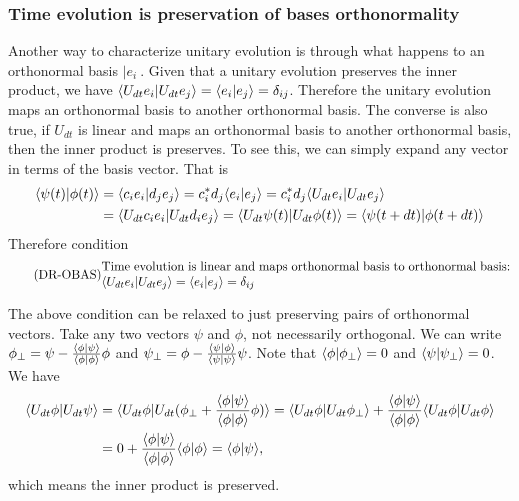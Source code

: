 \subsubsection{Time evolution is preservation of bases orthonormality}
Another way to characterize unitary evolution is through what happens to an orthonormal basis $|e_i\>$. Given that a unitary evolution preserves the inner product, we have $\langle U_{d t} e_i | U_{d t} e_j \rangle = \langle e_i | e_j \rangle = \delta_{ij}$. Therefore the unitary evolution maps an orthonormal basis to another orthonormal basis. The converse is also true, if $U_{dt}$ is linear and maps an orthonormal basis to another orthonormal basis, then the inner product is preserves. To see this, we can simply expand any vector in terms of the basis vector. That is
\begin{equation}
	\begin{aligned}
		\langle\psi(t) | \phi(t)\rangle &= \langle c_i e_i | d_j e_j\rangle = c_i^* d_j \langle e_i | e_j\rangle = c_i^* d_j \langle U_{d t} e_i | U_{d t} e_j\rangle \\
		&= \langle U_{d t} c_i e_i | U_{d t} d_i e_j\rangle = \langle U_{d t} \psi(t) | U_{d t} \phi(t)\rangle = \langle \psi(t + d t) | \phi(t + d t)\rangle \\
	\end{aligned}
\end{equation}
Therefore condition
\begin{equation}\label{rp-qm-uev-condOrthonormalBasis}
	\tag{DR-OBAS}
	\eqtext{Time evolution is linear and maps orthonormal basis to orthonormal basis: $\< U_{d t} e_i | U_{d t} e_j \> = \< e_i | e_j \> = \delta_{ij}$} 
\end{equation}

The above condition can be relaxed to just preserving pairs of orthonormal vectors. Take any two vectors $\psi$ and $\phi$, not necessarily orthogonal. We can write $\phi_{\perp} = \psi - \frac{\langle\phi | \psi\rangle}{\langle\phi | \phi\rangle }\phi $ and $\psi_{\perp} = \phi - \frac{\langle\psi | \phi\rangle}{\langle\psi | \psi\rangle }\psi $. Note that $\langle\phi | \phi_{\perp}\rangle = 0$ and $\langle\psi | \psi_{\perp}\rangle = 0$. We have
\begin{equation}
	\begin{aligned}
		\langle U_{dt} \phi | U_{dt} \psi \rangle &= \langle U_{dt} \phi | U_{dt} (\phi_{\perp} + \frac{\langle\phi | \psi\rangle}{\langle\phi | \phi\rangle }\phi) \rangle = \langle U_{dt} \phi | U_{dt} \phi_{\perp}\rangle + \frac{\langle\phi | \psi\rangle}{\langle\phi | \phi\rangle } \langle U_{dt} \phi | U_{dt} \phi \rangle \\
		&= 0 + \frac{\langle\phi | \psi\rangle}{\langle\phi | \phi\rangle } \langle \phi | \phi \rangle = \langle\phi | \psi\rangle,
	\end{aligned}
\end{equation}
which means the inner product is preserved.


